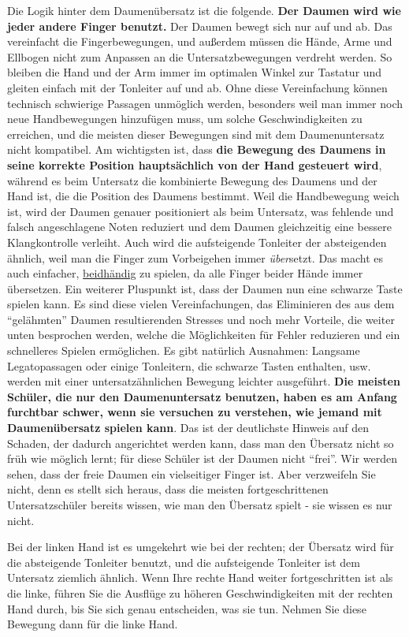 Die Logik hinter dem Daumenübersatz ist die folgende.
\textbf{Der Daumen wird wie jeder andere Finger benutzt.}
Der Daumen bewegt sich nur auf und ab.
Das vereinfacht die Fingerbewegungen, und außerdem müssen die Hände, Arme und Ellbogen nicht zum Anpassen an die Untersatzbewegungen verdreht werden.
So bleiben die Hand und der Arm immer im optimalen Winkel zur Tastatur und gleiten einfach mit der Tonleiter auf und ab.
Ohne diese Vereinfachung können technisch schwierige Passagen unmöglich werden, besonders weil man immer noch neue Handbewegungen hinzufügen muss, um solche Geschwindigkeiten zu erreichen, und die meisten dieser Bewegungen sind mit dem Daumenuntersatz nicht kompatibel.
Am wichtigsten ist, dass \textbf{die Bewegung des Daumens in seine korrekte Position hauptsächlich von der Hand gesteuert wird}, während es beim Untersatz die kombinierte Bewegung des Daumens und der Hand ist, die die Position des Daumens bestimmt.
Weil die Handbewegung weich ist, wird der Daumen genauer positioniert als beim Untersatz, was fehlende und falsch angeschlagene Noten reduziert und dem Daumen gleichzeitig eine bessere Klangkontrolle verleiht.
Auch wird die aufsteigende Tonleiter der absteigenden ähnlich, weil man die Finger zum Vorbeigehen immer \textit{über}setzt.
Das macht es auch einfacher, \hyperref[c1ii25]{beidhändig} zu spielen, da alle Finger beider Hände immer übersetzen.
Ein weiterer Pluspunkt ist, dass der Daumen nun eine schwarze Taste spielen kann.
Es sind diese vielen Vereinfachungen, das Eliminieren des aus dem \enquote{gelähmten} Daumen resultierenden Stresses und noch mehr Vorteile, die weiter unten besprochen werden, welche die Möglichkeiten für Fehler reduzieren und ein schnelleres Spielen ermöglichen.
Es gibt natürlich Ausnahmen: Langsame Legatopassagen oder einige Tonleitern, die schwarze Tasten enthalten, usw. werden mit einer untersatzähnlichen Bewegung leichter ausgeführt.
\textbf{Die meisten Schüler, die nur den Daumenuntersatz benutzen, haben es am Anfang furchtbar schwer, wenn sie versuchen zu verstehen, wie jemand mit Daumenübersatz spielen kann}.
Das ist der deutlichste Hinweis auf den Schaden, der dadurch angerichtet werden kann, dass man den Übersatz nicht so früh wie möglich lernt; für diese Schüler ist der Daumen nicht \enquote{frei}.
Wir werden sehen, dass der freie Daumen ein vielseitiger Finger ist.
Aber verzweifeln Sie nicht, denn es stellt sich heraus, dass die meisten fortgeschrittenen Untersatzschüler bereits wissen, wie man den Übersatz spielt - sie wissen es nur nicht.

Bei der linken Hand ist es umgekehrt wie bei der rechten; der Übersatz wird für die absteigende Tonleiter benutzt, und die aufsteigende Tonleiter ist dem Untersatz ziemlich ähnlich.
Wenn Ihre rechte Hand weiter fortgeschritten ist als die linke, führen Sie die Ausflüge zu höheren Geschwindigkeiten mit der rechten Hand durch, bis Sie sich genau entscheiden, was sie tun.
Nehmen Sie diese Bewegung dann für die linke Hand.

